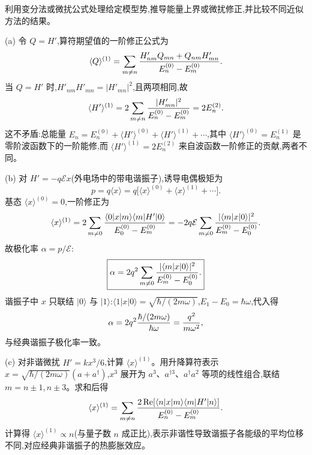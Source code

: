 \begin{question}
利用变分法或微扰公式处理给定模型势,推导能量上界或微扰修正,并比较不同近似方法的结果。
\end{question}
\begin{solution}
(a) 令 $Q=H'$,算符期望值的一阶修正公式为
\[
\langle Q\rangle^{(1)} = \sum_{m\ne n} {H'_{nm} Q_{mn} + Q_{nm} H'_{mn}\over E_n^{(0)}-E_m^{(0)}}.
\]
当 $Q=H'$ 时,$H'_{nm} H'_{mn}=|H'_{mn}|^2$,且两项相同,故
\[
\langle H'\rangle^{(1)} = 2\sum_{m\ne n}{|H'_{mn}|^2\over E_n^{(0)}-E_m^{(0)}} = 2E_n^{(2)}.
\]
这不矛盾:总能量 $E_n = E_n^{(0)} + \langle H'\rangle^{(0)} + \langle H'\rangle^{(1)} + \cdots$,其中 $\langle H'\rangle^{(0)}=E_n^{(1)}$ 是零阶波函数下的一阶能修,而 $\langle H'\rangle^{(1)}=2E_n^{(2)}$ 来自波函数一阶修正的贡献,两者不同。

(b) 对 $H'=-q\mathcal Ex$(外电场中的带电谐振子),诱导电偶极矩为
\[
p = q\langle x\rangle = q\bigl[\langle x\rangle^{(0)} + \langle x\rangle^{(1)} + \cdots\bigr].
\]
基态 $\langle x\rangle^{(0)}=0$,一阶修正为
\[
\langle x\rangle^{(1)} = 2\sum_{m\ne 0} {\langle0|x|m\rangle\langle m|H'|0\rangle\over E_0^{(0)}-E_m^{(0)}}
= -2q\mathcal E\sum_{m\ne0}{|\langle m|x|0\rangle|^2\over E_m^{(0)}-E_0^{(0)}}.
\]
故极化率 $\alpha = p/\mathcal E$:
\[
\boxed{\alpha = 2q^2\sum_{m\ne0}{|\langle m|x|0\rangle|^2\over E_m^{(0)}-E_0^{(0)}}.}
\]
谐振子中 $x$ 只联结 $|0\rangle$ 与 $|1\rangle$:$\langle1|x|0\rangle = \sqrt{\hbar/(2m\omega)}$,$E_1-E_0=\hbar\omega$,代入得
\[
\alpha = 2q^2{\hbar/(2m\omega)\over\hbar\omega} = {q^2\over m\omega^2},
\]
与经典谐振子极化率一致。

(c) 对非谐微扰 $H' = kx^3/6$,计算 $\langle x\rangle^{(1)}$。用升降算符表示 $x=\sqrt{\hbar/(2m\omega)}(a+a^\dagger)$,$x^3$ 展开为 $a^3$、$a^{\dagger3}$、$a^\dagger a^2$ 等项的线性组合,联结 $m=n\pm1,n\pm3$。求和后得
\[
\langle x\rangle^{(1)} = \sum_{m\ne n} {2\,\mathrm{Re}[\langle n|x|m\rangle\langle m|H'|n\rangle]\over E_n^{(0)}-E_m^{(0)}}.
\]
计算得 $\langle x\rangle^{(1)} \propto n$(与量子数 $n$ 成正比),表示非谐性导致谐振子各能级的平均位移不同,对应经典非谐振子的热膨胀效应。
\end{solution}

